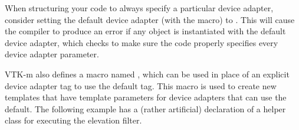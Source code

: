

When structuring your code to always specify a particular device adapter,
consider setting the default device adapter (with the
 macro) to
. This will cause the compiler to
produce an error if any object is instantiated with the default device
adapter, which checks to make sure the code properly specifies every device
adapter parameter.

VTK-m also defines a macro named
, which can be used in place
of an explicit device adapter tag to use the default tag. This macro is
used to create new templates that have template parameters for device
adapters that can use the default. The following example has a (rather
artificial) declaration of a helper class for executing the elevation
filter.



